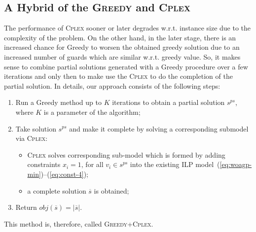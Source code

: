 \documentclass[runningheads,a4paper]{elsarticle}
\begin{document}
\subsection{A Hybrid of the \textsc{Greedy} and \textsc{Cplex}}
	The performance of \textsc{Cplex}  sooner or later degrades w.r.t. instance size due to the complexity of the problem. On the other hand, in the later stage, there is an increased chance for Greedy to worsen the obtained greedy solution due to an increased number of guards which are similar w.r.t. greedy value. So, it makes sense to combine  partial solutions generated with a Greedy procedure over a few iterations  and only then to make use the \textsc{Cplex} to do the completion of the partial solution. In details, our approach consists of the following steps:
	\begin{enumerate}
		\item Run a Greedy method up to $K$ iterations  to obtain a partial solution $s^{ps}$, where $K$ is a parameter of the algorithm;
		\item Take solution $s^{ps}$ and make it complete by solving a corresponding submodel via \textsc{Cplex}:
		\begin{itemize}
			\item \textsc{Cplex} solves corresponding sub-model which is formed by adding constraints $x_{i} = 1$, for all $v_i \in s^{ps}$ into the existing ILP  model~(\ref{eq:woagp-min})--(\ref{eq:const-4});
			\item a complete solution $\overline s$ is obtained;
		\end{itemize}
		\item Return $obj(\overline s)= |\overline{s}|$.
	\end{enumerate}
    This method is, therefore, called \textsc{Greedy}+\textsc{Cplex}.

	
\end{document}
